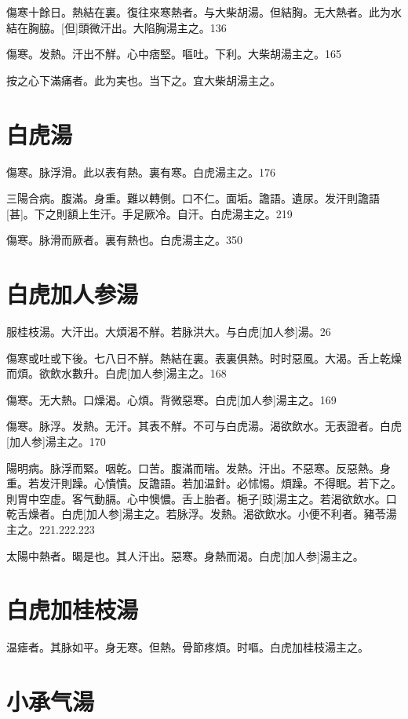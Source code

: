 \documentclass[12pt,oneside,UTF8,b5paper]{ctexbook}她她她她她她她
\begin{document}
傷寒十餘日。熱結在裏。復往來寒熱者。与大柴胡湯。但結胸。无大熱者。此为水結在胸脇。[但]頭微汗出。大陷胸湯主之。136

傷寒。发熱。汗出不觧。心中痞堅。嘔吐。下利。大柴胡湯主之。165

按之心下滿痛者。此为実也。当下之。宜大柴胡湯主之。

\section{白虎湯}

傷寒。脉浮滑。此以表有熱。裏有寒。白虎湯主之。176

三陽合病。腹滿。身重。難以轉側。口不仁。面垢。譫語。遺尿。发汗則譫語[甚]。下之則額上生汗。手足厥冷。自汗。白虎湯主之。219

傷寒。脉滑而厥者。裏有熱也。白虎湯主之。350

\section{白虎加人参湯}

服桂枝湯。大汗出。大煩渴不觧。若脉洪大。与白虎[加人参]湯。26

傷寒或吐或下後。七八日不觧。熱結在裏。表裏俱熱。时时惡風。大渴。舌上乾燥而煩。欲飲水數升。白虎[加人参]湯主之。168

傷寒。无大熱。口燥渴。心煩。背微惡寒。白虎[加人参]湯主之。169

傷寒。脉浮。发熱。无汗。其表不觧。不可与白虎湯。渴欲飲水。无表證者。白虎[加人参]湯主之。170

陽明病。脉浮而緊。咽乾。口苦。腹滿而喘。发熱。汗出。不惡寒。反惡熱。身重。若发汗則躁。心憒憒。反譫語。若加温針。必怵惕。煩躁。不得眠。若下之。則胃中空虚。客气動膈。心中懊憹。舌上胎者。梔子[豉]湯主之。若渴欲飲水。口乾舌燥者。白虎[加人参]湯主之。若脉浮。发熱。渴欲飲水。小便不利者。豬苓湯主之。221.222.223

太陽中熱者。暍是也。其人汗出。惡寒。身熱而渴。白虎[加人参]湯主之。

\section{白虎加桂枝湯}

温瘧者。其脉如平。身无寒。但熱。骨節疼煩。时嘔。白虎加桂枝湯主之。

\section{小承气湯}
\end{document}
